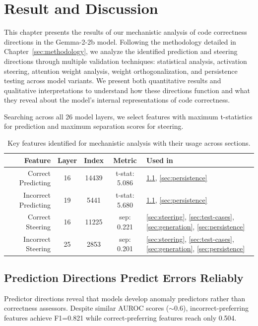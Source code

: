 
\chapter{Result and Discussion}
\label{sec:results}

This chapter presents the results of our mechanistic analysis of code correctness directions in the Gemma-2-2b model. Following the methodology detailed in Chapter~\ref{sec:methodology}, we analyze the identified prediction and steering directions through multiple validation techniques: statistical analysis, activation steering, attention weight analysis, weight orthogonalization, and persistence testing across model variants. We present both quantitative results and qualitative interpretations to understand how these directions function and what they reveal about the model's internal representations of code correctness.

Searching across all 26 model layers, we select features with maximum t-statistics for prediction and maximum separation scores for steering.

\begin{table}[h]
\centering
\begin{tabular}{rcccl}
\hline
\textbf{Feature} & \textbf{Layer} & \textbf{Index} & \textbf{Metric} & \textbf{Used in} \\
\hline
Correct Predicting & 16 & 14439 & t-stat: 5.086 & \ref{sec:prediction}, \ref{sec:persistence}  \\
Incorrect Predicting & 19 & 5441 & t-stat: 5.680 & \ref{sec:prediction}, \ref{sec:persistence} \\
Correct Steering & 16 & 11225 & sep: 0.221 & \ref{sec:steering}, \ref{sec:test-cases}, \ref{sec:generation}, \ref{sec:persistence} \\
Incorrect Steering & 25 & 2853 & sep: 0.201 & \ref{sec:steering}, \ref{sec:test-cases}, \ref{sec:generation}, \ref{sec:persistence} \\
\hline
\end{tabular}
\caption{Key features identified for mechanistic analysis with their usage across sections.}
\label{tab:feature_analysis}
\end{table}

\section{Prediction Directions Predict Errors Reliably}\label{sec:prediction}
Predictor directions reveal that models develop anomaly predictors rather than correctness assessors. Despite similar AUROC scores ($\sim$0.6), incorrect-preferring features achieve F1=0.821 while correct-preferring features reach only 0.504.

